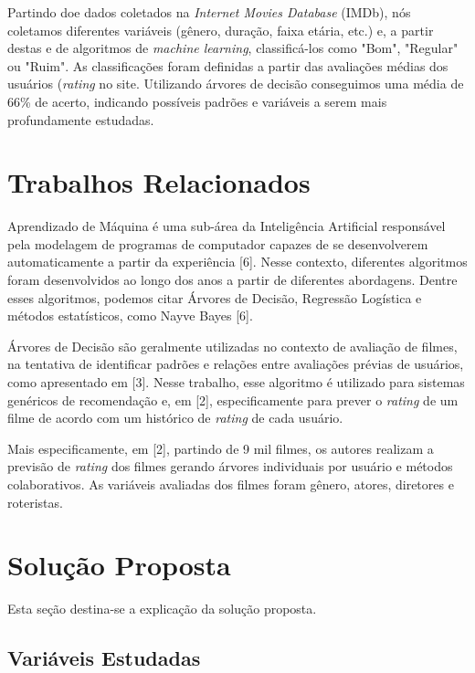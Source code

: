 \documentclass[twoside]{article}
\begin{document}
\begin{multicols}{2}
Partindo doe dados coletados na \textit{Internet Movies Database} (IMDb), nós coletamos diferentes variáveis (gênero, duração, faixa etária, etc.) e, a partir destas e de algoritmos de \textit{machine learning}, classificá-los como "Bom", "Regular" ou "Ruim". As classificações foram definidas a partir das avaliações médias dos usuários (\textit{rating} no site. Utilizando árvores de decisão conseguimos uma média de 66\% de acerto, indicando possíveis padrões e variáveis a serem mais profundamente estudadas.


\section{Trabalhos Relacionados}

Aprendizado de Máquina é uma sub-área da Inteligência Artificial responsável pela modelagem de programas de computador capazes de se desenvolverem automaticamente a partir da experiência [6]. Nesse contexto, diferentes algoritmos foram desenvolvidos ao longo dos anos a partir de diferentes abordagens. Dentre esses algoritmos, podemos citar Árvores de Decisão, Regressão Logística e métodos estatísticos, como Nayve Bayes [6].

Árvores de Decisão são geralmente utilizadas no contexto de avaliação de filmes, na tentativa de identificar padrões e relações entre avaliações prévias de usuários, como apresentado em [3]. Nesse trabalho, esse algoritmo é utilizado para sistemas genéricos de recomendação e, em [2], especificamente para prever o \textit{rating} de um filme de acordo com um histórico de \textit{rating} de cada usuário.

Mais especificamente, em [2], partindo de 9 mil filmes, os autores realizam a previsão de \textit{rating} dos filmes gerando árvores individuais por usuário e métodos colaborativos. As variáveis avaliadas dos filmes foram gênero, atores, diretores e roteristas.


\section{Solução Proposta}

Esta seção destina-se a explicação da solução proposta.

\subsection{Variáveis Estudadas}


\end{multicols}
\end{document}
